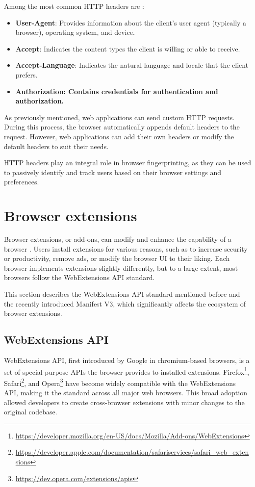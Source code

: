 Among the most common HTTP headers are \cite{MDN}:

\begin{itemize}
	\item \textbf{User-Agent}: Provides information about the client's user agent (typically a browser), operating system, and device.
	\item \textbf{Accept}: Indicates the content types the client is willing or able to receive.
	\item \textbf{Accept-Language}: Indicates the natural language and locale that the client prefers.
	\item \textbf{Authorization: Contains credentials for authentication and authorization.}
\end{itemize}

As previously mentioned, web applications can send custom HTTP requests. During this process, the browser automatically appends default headers to the request. However, web applications can add their own headers or modify the default headers to suit their needs.

HTTP headers play an integral role in browser fingerprinting, as they can be used to passively identify and track users based on their browser settings and preferences. 

\section{Browser extensions}

Browser extensions, or add-ons, can modify and enhance the capability of a browser \cite{MDNWebExtensions}. Users install extensions for various reasons, such as to increase security or productivity, remove ads, or modify the browser UI to their liking. Each browser implements extensions slightly differently, but to a large extent, most browsers follow the WebExtensions API standard.

This section describes the WebExtensions API standard mentioned before and the recently introduced Manifest V3, which significantly affects the ecosystem of browser extensions.

\label{Chapter:Extensions}

\subsection{WebExtensions API}
\label{Section:WebExtensionsAPI}

WebExtensions API, first introduced by Google in chromium-based browsers, is a set of special-purpose APIs the browser provides to installed extensions. Firefox\footnote{\url{https://developer.mozilla.org/en-US/docs/Mozilla/Add-ons/WebExtensions}}, Safari\footnote{\url{https://developer.apple.com/documentation/safariservices/safari_web_extensions}}, and Opera\footnote{\url{https://dev.opera.com/extensions/apis}} have become widely compatible with the WebExtensions API, making it the standard across all major web browsers. This broad adoption allowed developers to create cross-browser extensions with minor changes to the original codebase.


